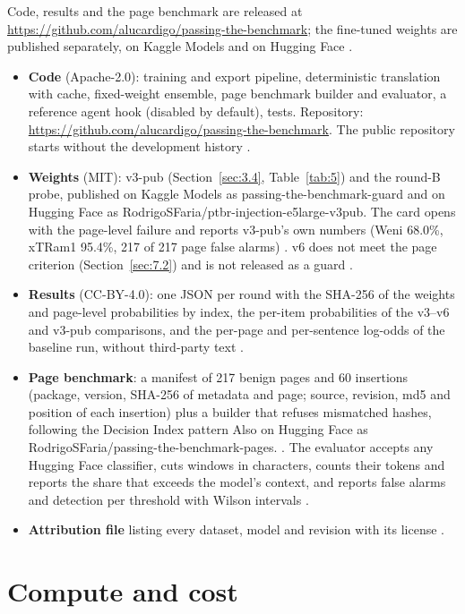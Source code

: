\documentclass[11pt]{article}
\begin{document}
Code, results and the page benchmark are released at \url{https://github.com/alucardigo/passing-the-benchmark}; the fine-tuned weights are published separately, on Kaggle Models and on Hugging Face%
.

\begin{itemize}
\item \textbf{Code} (Apache-2.0): training and export pipeline, deterministic translation with cache, fixed-weight ensemble, page benchmark builder and evaluator, a reference agent hook (disabled by default), tests. Repository: \url{https://github.com/alucardigo/passing-the-benchmark}. The public repository starts without the development history%
.
\item \textbf{Weights} (MIT): v3-pub (Section~\ref{sec:3.4}, Table~\ref{tab:5}) and the round-B probe, published on Kaggle Models as passing-the-benchmark-guard and on Hugging Face as RodrigoSFaria/ptbr-injection-e5large-v3pub. The card opens with the page-level failure and reports v3-pub's own numbers (Weni 68.0\%, xTRam1 95.4\%, 217 of 217 page false alarms)%
. v6 does not meet the page criterion (Section~\ref{sec:7.2}) and is not released as a guard%
.
\item \textbf{Results} (CC-BY-4.0): one JSON per round with the SHA-256 of the weights and page-level probabilities by index, the per-item probabilities of the v3–v6 and v3-pub comparisons, and the per-page and per-sentence log-odds of the baseline run, without third-party text%
.
\item \textbf{Page benchmark}: a manifest of 217 benign pages and 60 insertions (package, version, SHA-256 of metadata and page; source, revision, md5 and position of each insertion) plus a builder that refuses mismatched hashes, following the Decision Index pattern Also on Hugging Face as RodrigoSFaria/passing-the-benchmark-pages.%
. The evaluator accepts any Hugging Face classifier, cuts windows in characters, counts their tokens and reports the share that exceeds the model's context, and reports false alarms and detection per threshold with Wilson intervals%
.
\item \textbf{Attribution file} listing every dataset, model and revision with its license%
.
\end{itemize}




\appendix

\section{Compute and cost}\label{app:A}
\end{document}
